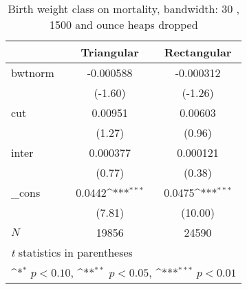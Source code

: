 \begin{table}[htbp]\centering
\def\sym#1{\ifmmode^{#1}\else\(^{#1}\)\fi}
\caption{Birth weight class on mortality, bandwidth: 30 , 1500 and ounce heaps dropped}
\begin{tabular}{l*{2}{c}}
\hline\hline
            &\multicolumn{1}{c}{Triangular}&\multicolumn{1}{c}{Rectangular}\\
\hline
bwtnorm     &   -0.000588         &   -0.000312         \\
            &     (-1.60)         &     (-1.26)         \\
[1em]
cut         &     0.00951         &     0.00603         \\
            &      (1.27)         &      (0.96)         \\
[1em]
inter       &    0.000377         &    0.000121         \\
            &      (0.77)         &      (0.38)         \\
[1em]
\_cons      &      0.0442\sym{***}&      0.0475\sym{***}\\
            &      (7.81)         &     (10.00)         \\
\hline
\(N\)       &       19856         &       24590         \\
\hline\hline
\multicolumn{3}{l}{\footnotesize \textit{t} statistics in parentheses}\\
\multicolumn{3}{l}{\footnotesize \sym{*} \(p<0.10\), \sym{**} \(p<0.05\), \sym{***} \(p<0.01\)}\\
\end{tabular}
\end{table}
